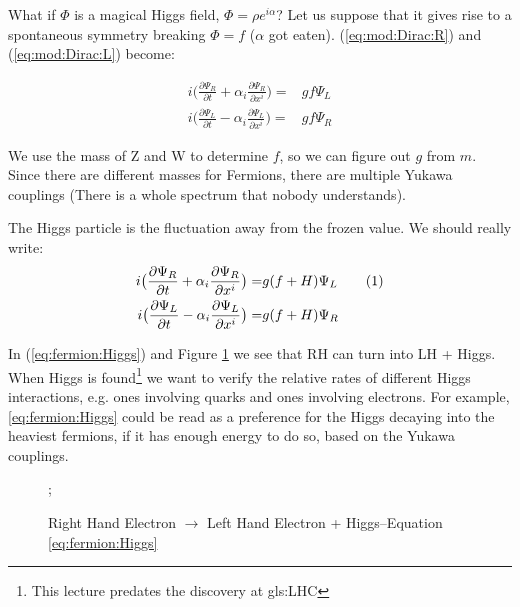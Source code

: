 \documentclass[]{article}
\newcommand\numberthis{\addtocounter{equation}{1}\tag{\theequation}}
\begin{document}
What if $\Phi$ is a magical Higgs field, $\Phi=\rho e^{i\alpha}$? Let us suppose that it gives rise to a spontaneous symmetry breaking $\Phi=f$ ($\alpha$ got eaten). (\ref{eq:mod:Dirac:R}) and (\ref{eq:mod:Dirac:L}) become:

 \begin{align*}
i \big(\frac{\partial \Psi_R}{\partial t} + \alpha_i \frac{\partial \Psi_R}{\partial 	x^i}\big) =& g f \Psi_L \\
i \big(\frac{\partial \Psi_L}{\partial t} - \alpha_i \frac{\partial \Psi_L}{\partial 	x^i}\big) =& g f \Psi_R  
\end{align*}

We use the mass of Z and W to determine $f$, so we can figure out $g$ from $m$. Since there are different masses for Fermions, there are multiple Yukawa couplings (There is a whole spectrum that nobody understands).

The Higgs particle is the fluctuation away from the frozen value. We should really write:
 \begin{align*}
i \big(\frac{\partial \Psi_R}{\partial t} + \alpha_i \frac{\partial \Psi_R}{\partial 	x^i}\big) =& g (f+H) \Psi_L  \numberthis \label{eq:fermion:Higgs}\\
i \big(\frac{\partial \Psi_L}{\partial t} - \alpha_i \frac{\partial \Psi_L}{\partial 	x^i}\big) =& g (f+H) \Psi_R  
\end{align*}

In (\ref{eq:fermion:Higgs}) and Figure \ref{fig:2-9-Higgs-boson} we see that RH can turn into LH + Higgs. When Higgs is found\footnote{This lecture predates the discovery at \gls{gls:LHC}} we want to verify the relative rates of different Higgs interactions, e.g. ones involving quarks and ones involving electrons. For example, \eqref{eq:fermion:Higgs} could be read as a preference for the Higgs decaying into the heaviest fermions, if it has enough energy to do so, based on the Yukawa couplings.

\begin{figure}[H]
	\begin{center}
		\caption[RH $\rightarrow$ LH + Higgs]{Right Hand Electron $\rightarrow$ Left Hand  Electron + Higgs--Equation \eqref{eq:fermion:Higgs}}\label{fig:2-9-Higgs-boson}
		;
	\end{center}
\end{figure}
\end{document}
